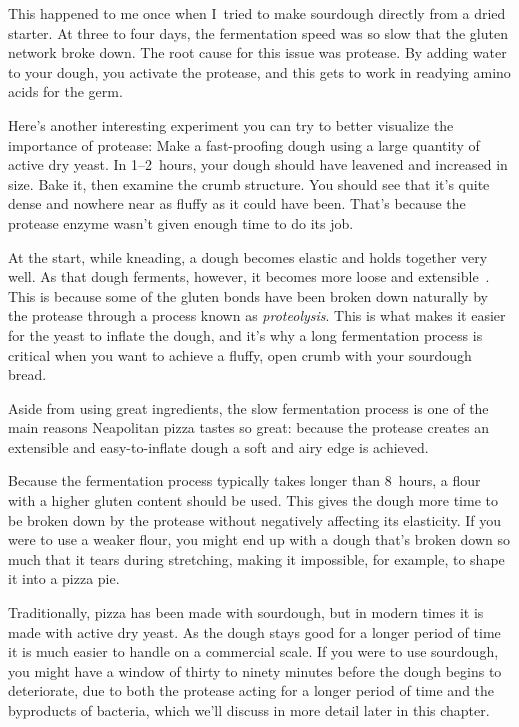 This happened to me once when I~tried to make sourdough directly from a dried
starter. At three to four days, the fermentation speed was so slow that the
gluten network broke down. The root cause for this issue was protease.
By adding water to your dough, you activate the protease, and this gets to work
in readying amino acids for the germ.

Here's another interesting experiment you can try to better visualize the
importance of protease: Make a fast-proofing dough using a large quantity
of active dry yeast. In 1--2~hours, your dough should have leavened and
increased in size. Bake it, then examine the crumb structure. You should see
that it's quite dense and nowhere near as fluffy as it could have been. That's
because the protease enzyme wasn't given enough time to do its job.

At the start, while kneading, a dough becomes elastic and holds together very
well. As that dough ferments, however, it becomes more loose and
extensible~\cite{protease+enzyme+bread}. This is because some of the gluten
bonds have
been broken down naturally by the protease through a process known as
\emph{proteolysis}. This is what makes it easier for the yeast to inflate the
dough, and it's why a long fermentation process is critical when you want to
achieve a fluffy, open crumb with your sourdough bread.

Aside from using great ingredients, the slow fermentation process is one of the
main reasons Neapolitan pizza tastes so great: because the protease creates an
extensible and easy-to-inflate dough a soft and airy edge is achieved.

Because the fermentation process typically takes longer than 8~hours, a
flour with a higher gluten content should be used. This gives the dough more
time to be broken down by the protease without negatively affecting its
elasticity. If you were to use a weaker flour, you might end up with a dough
that's broken down so much that it tears during stretching, making it
impossible, for example, to shape it into a pizza pie.

Traditionally, pizza has been made with sourdough, but in modern times it is
made with active dry yeast. As the dough stays good for a longer period of time
it is much easier to handle on a commercial scale. If you were to use
sourdough, you might have a window of thirty to ninety minutes before the dough
begins to deteriorate, due to both the protease acting for a longer period
of time and the byproducts of bacteria, which we'll discuss in more detail later
in this chapter.

